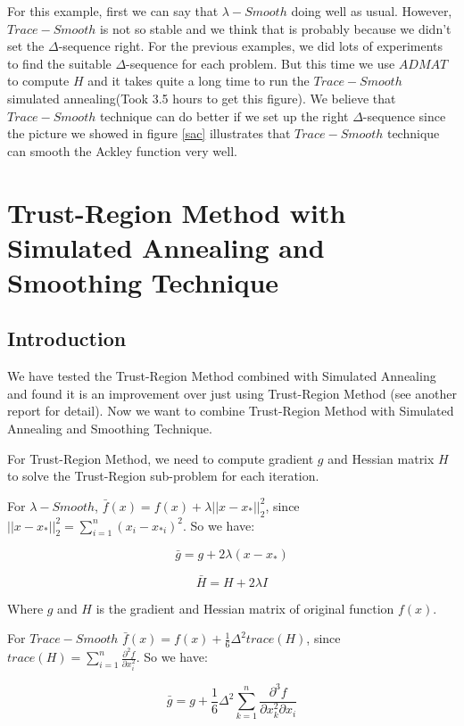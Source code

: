 \documentclass[letterpaper,12pt,titlepage,oneside,final]{book}
\begin{document}
For this example, first we can say that $\lambda-Smooth$ doing well as usual. However, $Trace-Smooth$ is not so stable and we think that is probably because we didn't set the $\Delta$-sequence right. For the previous examples, we did lots of experiments to find the suitable $\Delta$-sequence for each problem. But this time we use $ADMAT$ to compute $H$ and it takes quite a long time to run the $Trace-Smooth$ simulated annealing(Took 3.5 hours to get this figure). We believe that $Trace-Smooth$ technique can do better if we set up the right $\Delta$-sequence since the picture we showed in figure \ref{sac} illustrates that $Trace-Smooth$ technique can smooth the Ackley function very well.

\chapter{Trust-Region Method with Simulated Annealing and Smoothing Technique}

\section{Introduction}

We have tested the Trust-Region Method combined with Simulated Annealing and found it is an improvement over just using Trust-Region Method (see another report for detail). Now we want to combine Trust-Region Method with Simulated Annealing and Smoothing Technique. 

For Trust-Region Method, we need to compute gradient $g$ and Hessian matrix $H$ to solve the Trust-Region sub-problem for each iteration. 

For $\lambda-Smooth$, $\bar{f}(x)=f(x)+\lambda||x-x_*||_2^2$, since $||x-x_*||_2^2=\sum_{i=1}^n(x_i-x_{*i})^2$. So we have:

\begin{equation}
\bar{g}=g+2\lambda(x-x_*)
\end{equation}

\begin{equation}
\bar{H}=H+2\lambda I
\end{equation} 

Where $g$ and $H$ is the gradient and Hessian matrix of original function $f(x)$.

For $Trace-Smooth$ $\bar{f}(x)=f(x)+\frac{1}{6}\Delta^2trace(H)$, since $trace(H)=\sum_{i=1}^n\frac{\partial^2 f}{\partial x_i^2}$. So we have:

\begin{equation}
\bar{g}=g+\frac{1}{6}\Delta^2\sum_{k=1}^n\frac{\partial^3 f}{\partial x_k^2\partial x_i}
\end{equation}
\end{document}
